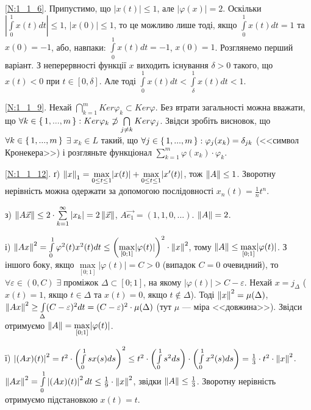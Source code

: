 
\noindent\ref{N:1_1_6}. Припустимо, що $|x(t)|\leq 1$, але $|\varphi(x)| = 2$.
Оскільки $|\int\limits^1_0 x(t) dt| \leq 1$, $|x(0)| \leq 1$, то це можливо лише тоді,
якщо $\int\limits^1_0 x(t) dt = 1$ та $x(0) = -1$, або, навпаки: $\int\limits^1_0 x(t) dt = -1$,
$x(0) = 1$. Розглянемо перший варіант. З неперервності функції $x$ виходить існування
$\delta > 0$ такого, що $x(t) < 0$ при $t \in [0,\delta]$. Але тоді 
$\int\limits^1_0 x(t) dt < \int\limits^1_\delta x(t) dt < 1$.

\noindent\ref{N:1_1_9}. Нехай $\bigcap\limits_{k=1}^m {Ker} \varphi_k \subset {Ker}\varphi$.
Без втрати загальності можна вважати, що $\forall k \in \set{1, ..., m}: {Ker} \varphi_k \not\supset \bigcap\limits_{j \neq k} {Ker} \varphi_j$.
Звідси зробіть висновок, що
$\forall k \in \set{1, ..., m}$ $\exists \; x_k \in L$
такий, що $\forall j \in \set{1, ..., m} : \varphi_j(x_k) = \delta_{jk}$ (<<символ Кронекера>>)
і розгляньте функціонал $\sum\limits_{k=1}^m \varphi(x_k) \cdot \varphi_k$.

\noindent\ref{N:1_1_12}.
ґ) $\left\lVert x\right\rVert_1 = \underset{0\leq t \leq 1}{\max} |x(t)| + \underset{0\leq t \leq 1}{\max} |x'(t)|$, тож $\left\lVert A\right\rVert \leq 1$.
Зворотну нерівність можна одержати за допомогою послідовності $x_n(t) = \frac{1}{n} t^n$.

\noindent з) $\left\lVert A\vec{x}\right\rVert \leq 2 \cdot \sum\limits_{k=1}^{\infty} |x_k| = 2 \left\lVert\vec{x}\right\rVert$, $A \vec{e_1} = (1, 1, 0, ...)$. $\left\lVert A\right\rVert = 2$.

\noindent і) $\left\lVert Ax\right\rVert^2 = \int\limits_0^1 \varphi^2 (t) x^2(t) dt \leq \left(\underset{[0;1]}{\max} |\varphi(t)|\right)^2 \cdot \left\lVert x\right\rVert^2 $, 
тому $\left\lVert A\right\rVert \leq \underset{[0;1]}{\max} |\varphi(t)|$.
З іншого боку, якщо $\underset{[0;1]}{\max} |\varphi(t)| = C > 0$ (випадок $C = 0$ очевидний), то
$\forall \varepsilon \in (0, C) \; \exists \; \text{проміжок } \Delta \subset [0;1]$,
на якому $|\varphi(t)| > C - \varepsilon$. Нехай $x = j_\Delta$ ($x(t) = 1$, якщо $t \in \Delta$ та $x(t) = 0$, якщо $t \notin \Delta$).
Тоді $\left\lVert x\right\rVert^2 = \mu(\Delta)$, $\left\lVert Ax\right\rVert^2 \geq \int\limits_\Delta (C-\varepsilon)^2 dt = (C-\varepsilon)^2 \cdot \mu(\Delta)$ (тут $\mu$ --- міра <<довжина>>).
Звідси отримуємо $\left\lVert A\right\rVert = \underset{[0;1]}{\max} |\varphi(t)|$.

\noindent ї) $\left| (Ax)(t) \right|^2 = t^2 \cdot \left( \int\limits_0^1 s x(s) ds\right)^2 \leq t^2 \cdot \left( \int\limits_0^1 s^2 ds\right) \cdot \left( \int\limits_0^1 x^2(s) ds\right) = \frac{1}{3} \cdot t^2 \cdot \left\lVert x\right\rVert^2$.
$\left\lVert Ax\right\rVert^2 = \int\limits_0^1 \left| (Ax)(t) \right|^2 dt \leq \frac{1}{9} \cdot \left\lVert x\right\rVert^2$, звідки $\left\lVert A\right\rVert \leq \frac{1}{3}$.
Зворотну нерівність отримуємо підстановкою $x(t) = t$.

